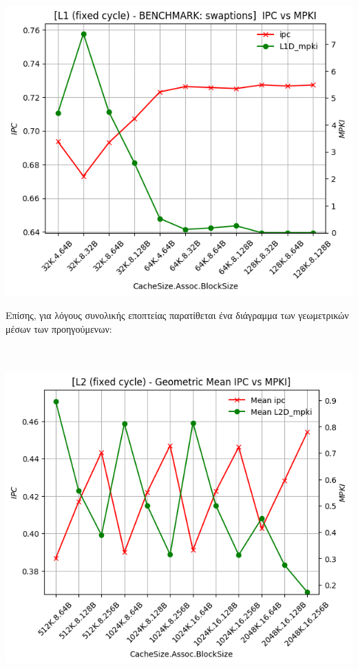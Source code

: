\begin{minipage}{\textwidth}
    \begin{center}
        \\
        \vspace{3mm}
        \includegraphics[scale=0.65]{graphs/L1/fixed/swaptions.png}
        \vspace{6mm}
    \end{center}
\end{minipage}

Επίσης, για λόγους συνολικής εποπτείας παρατίθεται ένα διάγραμμα των γεωμετρικών μέσων των προηγούμενων:\\\\
\begin{minipage}{\textwidth}
    \begin{center}
        \\
        \vspace{3mm}
        \includegraphics[scale=0.60]{graphs/L2/fixed/mean.png}
        \vspace{6mm}
    \end{center}
\end{minipage}

